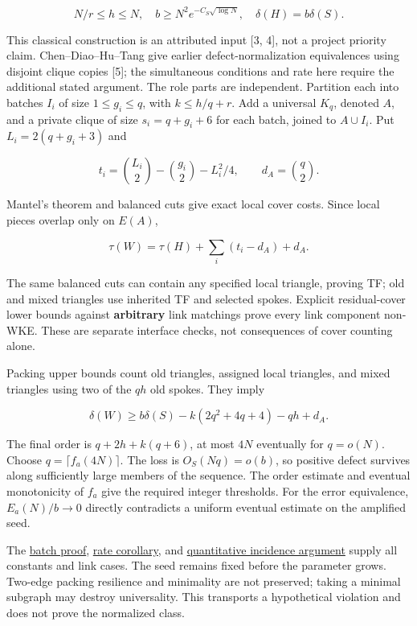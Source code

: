 \documentclass[11pt,a4paper]{article}
\begin{document}
\[N/r\le h\le N,\quad b\ge N^2e^{-C_S\sqrt{\log N}},\quad\delta(H)=b\delta(S).\]

This classical construction is an attributed input {[}3, 4{]}, not a project priority claim. Chen--Diao--Hu--Tang give earlier defect-normalization equivalences using disjoint clique copies {[}5{]}; the simultaneous conditions and rate here require the additional stated argument. The role parts are independent. Partition each into batches \(I_i\) of size \(1\le g_i\le q\), with \(k\le h/q+r\). Add a universal \(K_q\), denoted \(A\), and a private clique of size \(s_i=q+g_i+6\) for each batch, joined to \(A\cup I_i\). Put \(L_i=2(q+g_i+3)\) and

\[t_i=\binom{L_i}{2}-\binom{g_i}{2}-L_i^2/4,\qquad d_A=\binom q2.\]

Mantel's theorem and balanced cuts give exact local cover costs. Since local pieces overlap only on \(E(A)\),

\[\tau(W)=\tau(H)+\sum_i(t_i-d_A)+d_A.\]

The same balanced cuts can contain any specified local triangle, proving TF; old and mixed triangles use inherited TF and selected spokes. Explicit residual-cover lower bounds against \textbf{arbitrary} link matchings prove every link component non-WKE. These are separate interface checks, not consequences of cover counting alone.

Packing upper bounds count old triangles, assigned local triangles, and mixed triangles using two of the \(qh\) old spokes. They imply

\[\delta(W)\ge b\delta(S)-k(2q^2+4q+4)-qh+d_A.\]

The final order is \(q+2h+k(q+6)\), at most \(4N\) eventually for \(q=o(N)\). Choose \(q=\lceil f_a(4N)\rceil\). The loss is \(O_S(Nq)=o(b)\), so positive defect survives along sufficiently large members of the sequence. The order estimate and eventual monotonicity of \(f_a\) give the required integer thresholds. For the error equivalence, \(E_a(N)/b\to0\) directly contradicts a uniform eventual estimate on the amplified seed.

The \href{https://github.com/pappa211/ai-math-experiments/blob/main/problems/TUZA-19/notes/root_batched_universal_tf_nonwke.md}{batch proof}, \href{https://github.com/pappa211/ai-math-experiments/blob/main/problems/TUZA-19/notes/root_subexponential_normalization_corollary.md}{rate corollary}, and \href{https://github.com/pappa211/ai-math-experiments/blob/main/problems/TUZA-19/notes/global_routes_quantitative_amplification.md}{quantitative incidence argument} supply all constants and link cases. The seed remains fixed before the parameter grows. Two-edge packing resilience and minimality are not preserved; taking a minimal subgraph may destroy universality. This transports a hypothetical violation and does not prove the normalized class.
\end{document}

